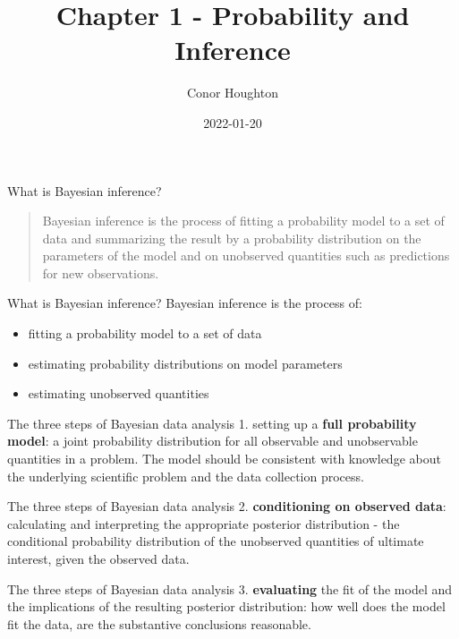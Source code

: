 \documentclass{beamer}
\title[Chapter 1]{Chapter 1 - Probability and Inference}
\author{Conor Houghton}
\institute{reading Gelman}
\date{2022-01-20}
\begin{document}
\maketitle

\begin{frame}{What is Bayesian inference?}
  \begin{quote}
    Bayesian inference is the process of fitting a probability model
    to a set of data and summarizing the result by a probability
    distribution on the parameters of the model and on unobserved
    quantities such as predictions for new observations.
  \end{quote}
\end{frame}

\begin{frame}{What is Bayesian inference?}
  Bayesian inference is the process of:
\begin{itemize}
\item fitting a probability model to a set of data
\item estimating probability distributions on model parameters
\item estimating unobserved quantities 
\end{itemize}
\end{frame}

\begin{frame}{The three steps of Bayesian data analysis}
1. setting up a \textbf{full probability model}: a joint probability
distribution for all observable and unobservable quantities in a
problem. The model should be consistent with knowledge about the
underlying scientific problem and the data collection process.
\end{frame}

\begin{frame}{The three steps of Bayesian data analysis}
2. \textbf{conditioning on observed data}: calculating and
interpreting the appropriate posterior distribution - the conditional
probability distribution of the unobserved quantities of ultimate
interest, given the observed data.
\end{frame}

\begin{frame}{The three steps of Bayesian data analysis}
  3. \textbf{evaluating} the fit of the model and the implications of the resulting posterior distribution: how well does the model fit the data, are the substantive conclusions reasonable.
\end{frame}
\end{document}
